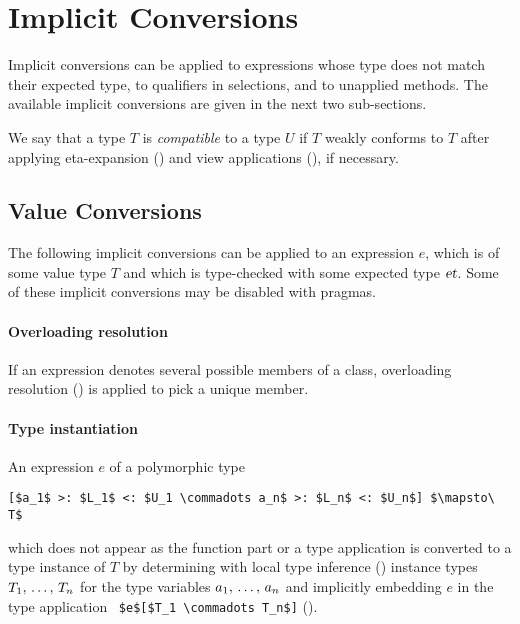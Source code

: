 




\section{Implicit Conversions}
\label{sec:implicit-conversions}

Implicit conversions can be applied to expressions whose type does not match their expected type, to qualifiers in selections, and to unapplied methods. The available implicit conversions are given in the next two sub-sections.

We say that a type $T$ is {\em compatible} to a type $U$ if $T$ weakly conforms to $T$ after applying eta-expansion () and view applications (), if necessary.






\subsection{Value Conversions}
\label{sec:value-conversions}

The following implicit conversions can be applied to an expression $e$, which is of some value type $T$ and which is type-checked with some expected type $\mbox{\sl et}$. Some of these implicit conversions may be disabled with pragmas.

\paragraph{Overloading resolution}
If an expression denotes several possible members of a class, overloading resolution () is applied to pick a unique member. 

\paragraph{Type instantiation}
An expression $e$ of a polymorphic type
\begin{lstlisting}
[$a_1$ >: $L_1$ <: $U_1 \commadots a_n$ >: $L_n$ <: $U_n$] $\mapsto\ T$
\end{lstlisting}
which does not appear as the function part or a type application is converted to a type instance of $T$ by determining with local type inference () instance types $T_1 ,\, \ldots ,\, T_n$ for the type variables $a_1 ,\, \ldots ,\, a_n$ and implicitly embedding $e$ in the type application ~\lstinline!$e$[$T_1 \commadots T_n$]! (). 

